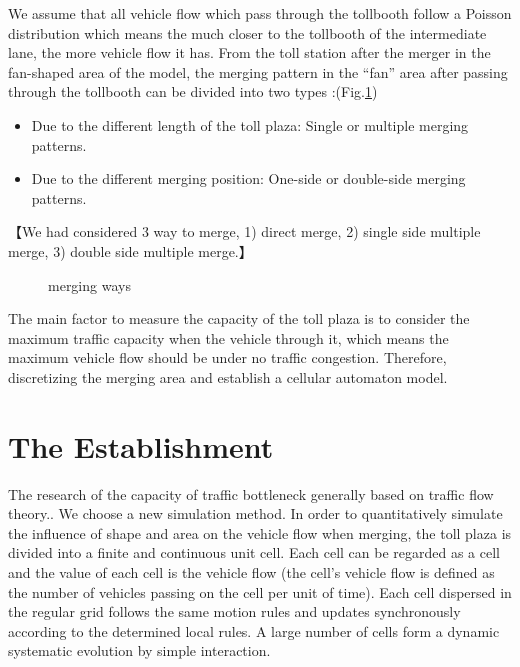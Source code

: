 \documentclass{mcmthesis}
\begin{document}
We assume that all vehicle flow which pass through the tollbooth follow a Poisson distribution which means the much closer to the tollbooth of the intermediate lane, the more vehicle flow it has. From the toll station after the merger in the fan-shaped area of the model, the merging pattern in the “fan” area after passing through the tollbooth can be divided into two types :(Fig.\ref{fig:merge_ways})
\begin{itemize}
	\item Due to the different length of the toll plaza: Single or multiple merging patterns.
	\item Due to the different merging position: One-side or double-side merging patterns.
\end{itemize}
【We had considered 3 way to merge, 1) direct merge, 2) single side multiple merge, 3) double side multiple merge.】
\begin{figure}[!htbp]
	\centering
	\caption{\label{fig:merge_ways}merging ways}
\end{figure}

The main factor to measure the capacity of the toll plaza is to consider the maximum traffic capacity when the vehicle through it, which means the maximum vehicle flow should be under no traffic congestion. Therefore, discretizing the merging area and establish a cellular automaton model.

\section{The Establishment }
The research of the capacity of traffic bottleneck generally based on traffic flow theory.\cite{vickrey1969congestion}\cite{Xiao201448}. We choose a new simulation method.
In order to quantitatively simulate the influence of shape and area on the vehicle flow when merging, the toll plaza is divided into a finite and continuous unit cell. Each cell can be regarded as a cell and the value of each cell is the vehicle flow (the cell’s vehicle flow is defined as the number of vehicles passing on the cell per unit of time). Each cell dispersed in the regular grid follows the same motion rules and updates synchronously according to the determined local rules. A large number of cells form a dynamic systematic evolution by simple interaction.
\end{document}
